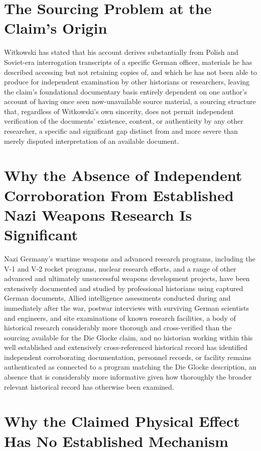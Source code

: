 \documentclass[11pt]{article}
\begin{document}
\section{The Sourcing Problem at the Claim's Origin}

Witkowski has stated that his account derives substantially from Polish and Soviet-era interrogation transcripts of a specific German officer, materials he has described accessing but not retaining copies of, and which he has not been able to produce for independent examination by other historians or researchers, leaving the claim's foundational documentary basis entirely dependent on one author's account of having once seen now-unavailable source material, a sourcing structure that, regardless of Witkowski's own sincerity, does not permit independent verification of the documents' existence, content, or authenticity by any other researcher, a specific and significant gap distinct from and more severe than merely disputed interpretation of an available document.

\section{Why the Absence of Independent Corroboration From Established Nazi Weapons Research Is Significant}

Nazi Germany's wartime weapons and advanced research programs, including the V-1 and V-2 rocket programs, nuclear research efforts, and a range of other advanced and ultimately unsuccessful weapons development projects, have been extensively documented and studied by professional historians using captured German documents, Allied intelligence assessments conducted during and immediately after the war, postwar interviews with surviving German scientists and engineers, and site examinations of known research facilities, a body of historical research considerably more thorough and cross-verified than the sourcing available for the Die Glocke claim, and no historian working within this well established and extensively cross-referenced historical record has identified independent corroborating documentation, personnel records, or facility remains authenticated as connected to a program matching the Die Glocke description, an absence that is considerably more informative given how thoroughly the broader relevant historical record has otherwise been examined.

\section{Why the Claimed Physical Effect Has No Established Mechanism}
\end{document}
